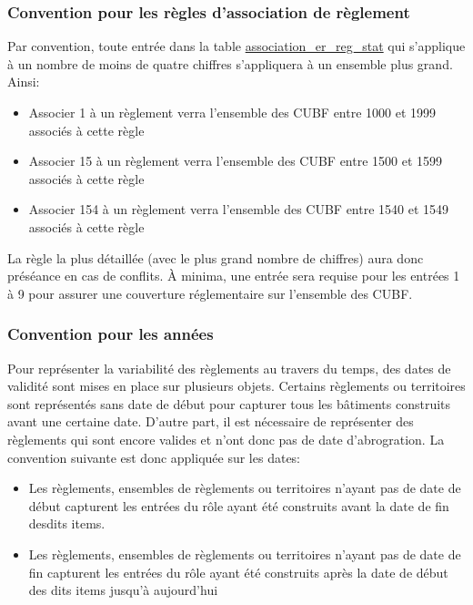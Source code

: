         \subsubsection{Convention pour les règles d'association de règlement}\label{sec:reg_association}
        Par convention, toute entrée dans la table \underline{association\_er\_reg\_stat} qui s'applique à un nombre de moins de quatre chiffres s'appliquera à un ensemble plus grand. Ainsi:
        \begin{itemize}
            \item Associer 1 à un règlement verra l'ensemble des \ac{CUBF} entre 1000 et 1999 associés à cette règle
            \item Associer 15 à un règlement verra l'ensemble des \ac{CUBF} entre 1500 et 1599 associés à cette règle
            \item Associer 154 à un règlement verra l'ensemble des \ac{CUBF} entre 1540 et 1549 associés à cette règle
        \end{itemize}
        La règle la plus détaillée (avec le plus grand nombre de chiffres) aura donc préséance en cas de conflits. À minima, une entrée sera requise pour les entrées 1 à 9 pour assurer une couverture réglementaire sur l'ensemble des \ac{CUBF}.\par
        \subsubsection{Convention pour les années}
        Pour représenter la variabilité des règlements au travers du temps, des dates de validité sont mises en place sur plusieurs objets. Certains règlements ou territoires sont représentés sans date de début pour capturer tous les bâtiments construits avant une certaine date. D'autre part, il est nécessaire de représenter des règlements qui sont encore valides et n'ont donc pas de date d'abrogration. La convention suivante est donc appliquée sur les dates:
        \begin{itemize}
            \item Les règlements, ensembles de règlements ou territoires n'ayant pas de date de début capturent les entrées du rôle ayant été construits avant la date de fin desdits items.
            \item Les règlements, ensembles de règlements ou territoires n'ayant pas de date de fin capturent les entrées du rôle ayant été construits après la date de début des dits items jusqu'à aujourd'hui
        \end{itemize}
